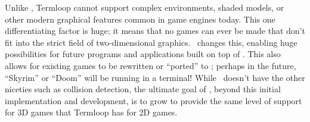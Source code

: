 Unlike \name, Termloop cannot support complex environments, shaded models, or other modern graphical features common in game engines today.
This one differentiating factor is huge; it means that no games can ever be made that don't fit into the strict field of two-dimensional graphics.
\name\ changes this, enabling huge possibilities for future programs and applications built on top of \name.
This also allows for existing games to be rewritten or ``ported'' to \name; perhaps in the future, ``Skyrim'' or ``Doom'' will be running in a terminal!
While \name\ doesn't have the other niceties such as collision detection, the ultimate goal of \name, beyond this initial implementation and development, is to grow to provide the same level of support for 3D games that Termloop has for 2D games.
